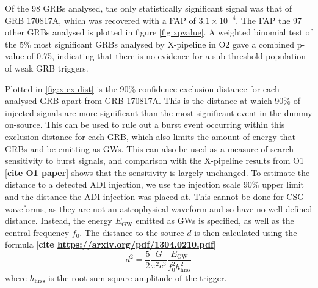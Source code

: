 \documentclass[11pt]{cuthesis}
\newcommand{\xp}{X-pipeline }
\begin{document}
Of the 98 GRBs analysed, the only statistically significant signal was that of GRB 170817A, which was recovered with a FAP of $3.1\times 10^{-4}$. The FAP the 97 other GRBs analysed is plotted in figure \ref{fig:xpvalue}. A weighted binomial test of the 5\% most significant GRBs analysed by \xp in O2 gave a combined p-value of 0.75, indicating that there is no evidence for a sub-threshold population of weak GRB triggers. 

Plotted in \ref{fig:x ex dist} is the 90\% confidence exclusion distance for each analysed GRB apart from GRB 170817A. This is the distance at which 90\% of injected signals are more significant than the most significant event in the dummy on-source. This can be used to rule out a burst event occurring within this exclusion distance for each GRB, which also limits the amount of energy that GRBs and be emitting as GWs. This can also be used as a measure of search sensitivity to burst signals, and comparison with the \xp results from O1 [\textbf{cite O1 paper}] shows that the sensitivity is largely unchanged. To estimate the distance to a detected ADI injection, we use the injection scale 90\% upper limit and the distance the ADI injection was placed at. This cannot be done for CSG waveforms, as they are not an astrophysical waveform and so have no well defined distance. Instead, the energy $E_\text{GW}$ emitted as GWs is specified, as well as the central frequency $f_0$. The distance to the source $d$ is then calculated using the formula [\textbf{cite \url{https://arxiv.org/pdf/1304.0210.pdf}}]
\begin{equation}
d^2 = \frac{5}{2}\frac{G}{\pi^2 c^3}\frac{E_\text{GW}}{f_0^2 h_\text{hrss}^2 }  
\end{equation}
where $h_\text{hrss}$ is the root-sum-square amplitude of the trigger.
\end{document}
